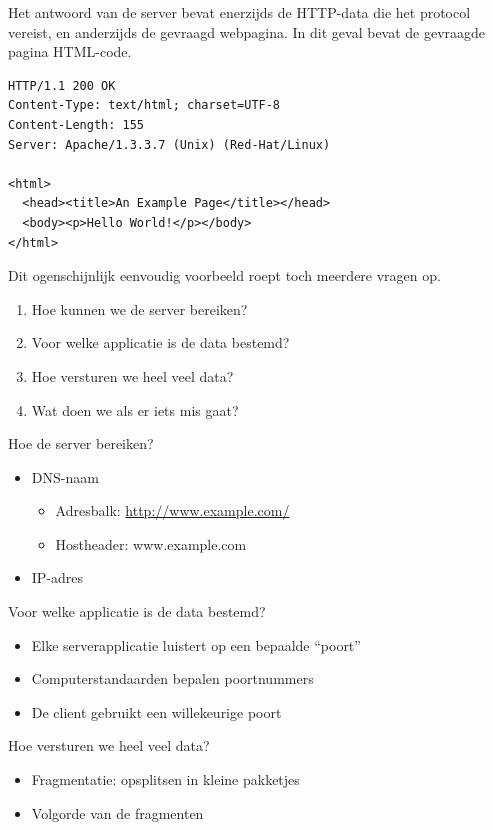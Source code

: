 Het antwoord van de server bevat enerzijds de HTTP-data die het protocol vereist, en anderzijds de gevraagd webpagina.
In dit geval bevat de gevraagde pagina HTML-code.
\begin{verbatim}
HTTP/1.1 200 OK
Content-Type: text/html; charset=UTF-8
Content-Length: 155
Server: Apache/1.3.3.7 (Unix) (Red-Hat/Linux)

<html>
  <head><title>An Example Page</title></head>
  <body><p>Hello World!</p></body>
</html>
\end{verbatim}

Dit ogenschijnlijk eenvoudig voorbeeld roept toch meerdere vragen op.
\begin{enumerate}
\item Hoe kunnen we de server bereiken?
\item Voor welke applicatie is de data bestemd?
\item Hoe versturen we heel veel data?
\item Wat doen we als er iets mis gaat?
\end{enumerate}






\begin{frame}{Hoe de server bereiken?}
\begin{itemize}
\item<1-> DNS-naam
    \begin{itemize}
    \item Adresbalk: \url{http://www.example.com/}
    \item Hostheader: www.example.com
    \end{itemize}
\item<2-> IP-adres
\end{itemize}
\end{frame}



\begin{frame}{Voor welke applicatie is de data bestemd?}
\begin{itemize}[<+->]
\item Elke serverapplicatie luistert op een bepaalde ``poort''
\item Computerstandaarden bepalen poortnummers
\item De client gebruikt een willekeurige poort
\end{itemize}
\end{frame}



\begin{frame}{Hoe versturen we heel veel data?}
\begin{itemize}[<+->]
\item Fragmentatie: opsplitsen in kleine pakketjes
\item Volgorde van de fragmenten
\end{itemize}
\end{frame}



